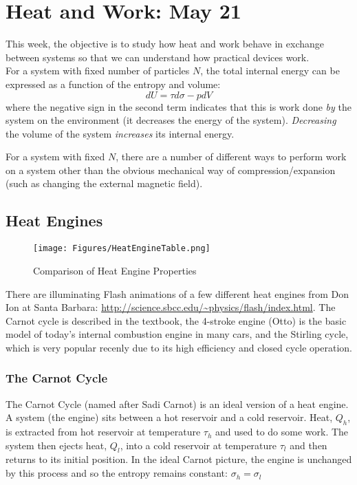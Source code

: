 \section{Heat and Work: May 21}
\label{s:HeatWork}
This week, the objective is to study how heat and work behave in exchange between systems so that we can understand how practical devices work.\\

For a system with fixed number of particles $N$, the total internal energy can be expressed as a function of the entropy and volume:
\begin{equation}
dU = \tau d\sigma - p dV
\end{equation}
where the negative sign in the second term indicates that this is work done \textit{by} the system on the environment (it decreases the energy of the system). \emph{Decreasing} the volume of the system \emph{increases} its internal energy.

For a system with fixed $N$, there are a number of different ways to perform work on a system other than the obvious mechanical way of compression/expansion (such as changing the external magnetic field).

\subsection{Heat Engines}
\begin{figure}[h]
\centering
\texttt{[image: Figures/HeatEngineTable.png]}
\caption{Comparison of Heat Engine Properties}
\end{figure}

There are illuminating Flash animations of a few different heat engines from Don Ion at Santa Barbara:
\url{http://science.sbcc.edu/~physics/flash/index.html}. The Carnot cycle is described in the textbook,
the 4-stroke engine (Otto) is the basic model of today's internal combustion engine in many cars, and
the Stirling cycle, which is very popular recenly due to its high efficiency and closed cycle operation.

\subsubsection{The Carnot Cycle}
The Carnot Cycle (named after Sadi Carnot) is an ideal version of a heat engine. A system (the engine) sits between a hot reservoir and a cold reservoir. Heat, $Q_h$, is extracted from hot reservoir at temperature $\tau_h$ and used to do some work. The system then ejects heat, $Q_l$, into a cold reservoir at temperature $\tau_l$ and then returns to its initial position. In the ideal Carnot picture, the engine is unchanged by this process and so the entropy remains constant: $\sigma_h = \sigma_l$

